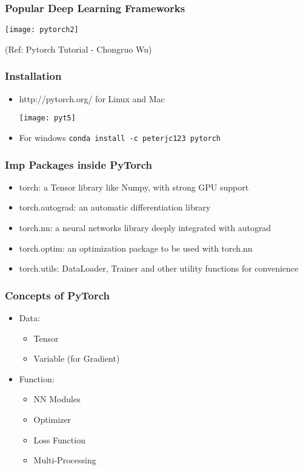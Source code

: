 \begin{frame}[fragile] \frametitle{Popular Deep Learning Frameworks}


\begin{center}
\texttt{[image: pytorch2]}
\end{center}

  {\tiny (Ref: Pytorch Tutorial - Chongruo Wu)}

\end{frame}



\begin{frame}[fragile] \frametitle{Installation}

\begin{itemize}
\item  http://pytorch.org/ for Linux and Mac
\begin{center}
\texttt{[image: pyt5]}
\end{center}
\item For windows \lstinline|conda install -c peterjc123 pytorch|
\end{itemize}

\end{frame}


\begin{frame}[fragile] \frametitle{Imp Packages inside PyTorch}
\begin{itemize}
\item  torch: a Tensor library like Numpy, with strong GPU support
\item torch.autograd: an automatic differentiation library 
\item torch.nn: a neural networks library deeply integrated with autograd 
\item torch.optim: an optimization package to be used with torch.nn
\item torch.utils: DataLoader, Trainer and other utility functions for convenience
\end{itemize}
\end{frame}


\begin{frame}[fragile] \frametitle{Concepts of PyTorch}
\begin{itemize}
\item Data:
\begin{itemize}
\item  Tensor
\item Variable (for Gradient)
\end{itemize}
\item Function:
\begin{itemize}
\item   NN Modules
\item   Optimizer
\item   Loss Function
\item   Multi-Processing
\end{itemize}
\end{itemize}
\end{frame}

